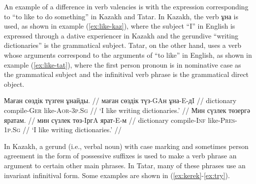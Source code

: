 \documentclass[11pt]{article}
\newcommand{\gmk}[1]{{\qipb\scshape #1}}
\newcommand{\eng}[1]{`#1'}
\begin{document}



An example of a difference in verb valencies is with the expression corresponding 
to ``to like to do something'' in Kazakh and Tatar.  In Kazakh, the verb ұна is used, as shown in 
example (\ref{ex:like-kaz}), where the subject ``I'' in English is expressed through a dative 
experiencer in Kazakh and the gerundive ``writing dictionaries'' is the grammatical subject.  Tatar, on the 
other hand, uses a verb whose arguments correspond to the arguments of ``to like'' in English, as 
shown in example (\ref{ex:like-tat}), where the first person pronoun is in nominative case as 
the grammatical subject and the infinitival verb phrase is the grammatical direct object.

\pex[everygla=,everyglb=,everyglc=,aboveglbskip=0pt,aboveglftskip=0ex]  %
\a\label{ex:like-kaz}
\begingl
\gla Маған сөздік түзген ұнайды. //
\glb маған сөздік түз-GAн ұна-E-дI //
\glb \gmk{1p.Sg.Dat} dictionary compile-\gmk{Ger} like-\gmk{Aor}-\gmk{3p.Sg} //
\glft \eng{I like writing dictionaries.} //
\endgl
\a\label{ex:like-tat}
\begingl
\gla Мин сүзлек төзергә яратам. //
\glb мин сүзлек төз-IргA ярат-E-м //
\glb \gmk{1p.Sg} dictionary compile-\gmk{Inf} like-\gmk{Pres}-\gmk{1p.Sg} //
\glft \eng{I like writing dictionaries.} //
\endgl
\xe


In Kazakh, a gerund (i.e., verbal noun) with case marking and sometimes person agreement in the form of 
possessive suffixes is used to make a verb phrase an argument to certain other main phrases.  In Tatar, many 
of these phrases use an invariant infinitival form.  Some examples are shown in (\ref{ex:kerek}-\ref{ex:try}).

%
\end{document}
